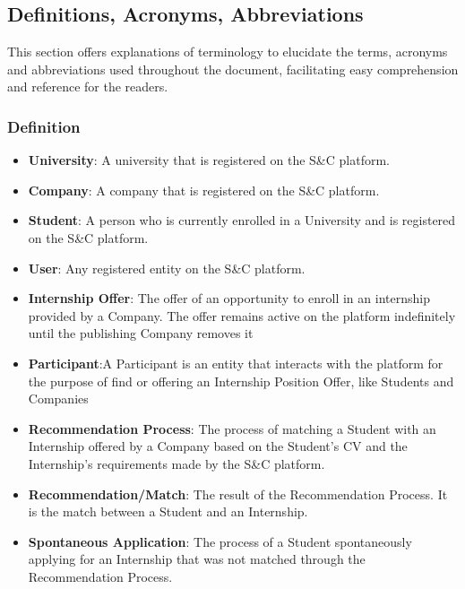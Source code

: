 \subsection{Definitions, Acronyms, Abbreviations} 
This section offers explanations of terminology to elucidate the terms, acronyms and abbreviations used throughout the document, facilitating easy comprehension and reference for the readers.
\subsubsection{Definition}
\begin{itemize}
    \item \textcolor{titleColor}{\textbf{University}\label{def:university}}: A university that is registered on the S\&C platform.
    \item \textcolor{titleColor}{\textbf{Company}\label{def:company}}: A company that is registered on the S\&C platform.
    \item \textcolor{titleColor}{\textbf{Student}\label{def:student}}: A person who is currently enrolled in a University and is registered on the S\&C platform.
    \item \textcolor{titleColor}{\textbf{User}\label{def:user}}: Any registered entity on the S\&C platform.
    \item \textcolor{titleColor}{\textbf{Internship Offer}\label{def:internshipOffer}}: The offer of an opportunity to enroll in an internship provided by a Company. The offer remains active on the platform indefinitely until the publishing Company removes it
    \item \textcolor{titleColor}{\textbf{Participant}}\label{def:participant}:{A Participant is an entity that interacts with the platform for the purpose of find or offering an Internship Position Offer, like Students and Companies
    }
    \item \textcolor{titleColor}{\textbf{Recommendation Process}}\label{def:recommendationProcess}: The process of matching a Student with an Internship offered by a Company based on the Student's CV and the Internship's requirements made by the S\&C platform.
    \item \textcolor{titleColor}{\textbf{Recommendation/Match}\label{def:match}}: The result of the Recommendation Process. It is the match between a Student and an Internship.
    \item \textcolor{titleColor}{\textbf{Spontaneous Application}\label{def:spontaneousApplication}}: The process of a Student spontaneously applying for an Internship that was not matched through the Recommendation Process.

\end{itemize}
